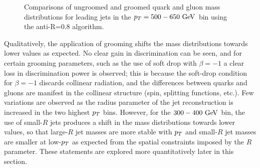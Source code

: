 \begin{figure}
\begin{center}
\caption{Comparisons of ungroomed and groomed quark and gluon mass distributions for leading jets in the 
$\pt=500-650 \GeV$ bin using the anti-\kT R=0.8 algorithm. }
\label{fig:qg_pt500_mass_AKt_R08}
\end{center}
\end{figure}
Qualitatively, the application of grooming shifts the mass distributions towards
lower values as expected. No clear gain in discrimination can be seen, and for
certain grooming parameters, such as the use of soft drop with $\beta=-1$ a clear
loss in discrimination power is observed; this is because the soft-drop condition for $\beta=-1$ discards collinear radiation, and the differences between quarks and gluons are manifest in the collinear structure (spin, splitting functions, etc.). 
 Few variations are observed as the 
radius parameter of the jet reconstruction is increased in the two highest $p_T$ bins. 
However, for the $300-400\GeV$ bin, the use of small-$R$ jets produces a shift in the
mass distributions towards lower values, so that large-$R$ jet masses are more stable
with $p_T$ and small-$R$ jet masses are smaller at low-$p_T$ as expected from the spatial
constraints imposed by the $R$ parameter. These statements are explored more 
quantitatively later in this section. 

